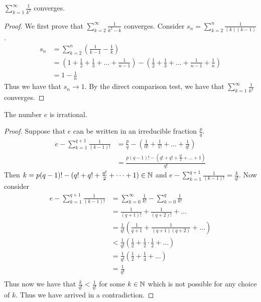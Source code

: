 \documentclass[a4paper]{article}
\begin{document}
\begin{lmm}{}{} $\sum_{k=1}^\infty\frac{1}{k^2}$ converges. \tcbline
\begin{proof} We first prove that $\sum_{k=2}^{\infty}\frac{1}{k^2-k}$ converges. Consider $s_n=\sum_{k=2}^{n}\frac{1}{(k)(k-1)}$. 
\begin{align*}
s_n&=\sum_{k=2}^{n}\left(\frac{1}{k-1}-\frac{1}{k}\right)\\
&=\left(1+\frac{1}{2}+\frac{1}{3}+\dots+\frac{1}{n-1}\right)-\left(\frac{1}{2}+\frac{1}{3}+\dots+\frac{1}{n-1}+\frac{1}{n}\right)\\
&=1-\frac{1}{n}
\end{align*}
Thus we have that $s_n\to1$. By the direct comparison test, we have that $\sum_{k=1}^\infty\frac{1}{k^2}$ converges. 
\end{proof}
\end{lmm}

\begin{lmm}{}{} The number $e$ is irrational. \tcbline
\begin{proof} Suppose that $e$ can be written in an irreducible fraction $\frac{p}{q}$. 
\begin{align*}
e-\sum_{k=1}^{q+1}\frac{1}{(k-1)!}&=\frac{p}{q}-\left(\frac{1}{0!}+\frac{1}{1!}+\dots+\frac{1}{q!}\right)\\
&=\frac{p(q-1)!-(q!+q!+\frac{q!}{2}+\dots+1)}{q!}
\end{align*}
Then $k=p(q-1)!-(q!+q!+\frac{q!}{2}+\dots+1)\in\mathbb{N}$ and $e-\sum_{k=1}^{q+1}\frac{1}{(k-1)!}=\frac{k}{q!}$. 
Now consider 
\begin{align*}
e-\sum_{k=1}^{q+1}\frac{1}{(k-1)!}&=\sum_{k=0}^{\infty}\frac{1}{k!}-\sum_{k=0}^{q}\frac{1}{k!}\\
&=\frac{1}{(q+1)!}+\frac{1}{(q+2)!}+\dots\\
&=\frac{1}{q!}\left(\frac{1}{q+1}+\frac{1}{(q+1)(q+2)}+\dots\right)\\
&<\frac{1}{q!}\left(\frac{1}{2}+\frac{1}{2}\cdot\frac{1}{2}+\dots\right)\tag{since $q>1$}\\
&=\frac{1}{q!}\left(\frac{1}{2}+\frac{1}{4}+\dots\right)\\
&=\frac{1}{q!}\tag{by geometric series}\\
\end{align*}
Thus now we have that $\frac{k}{q!}<\frac{1}{q!}$ for some $k\in\mathbb{N}$ which is not possible for any choice of $k$. Thus we have arrived in a contradiction. 
\end{proof}
\end{lmm}
\end{document}
